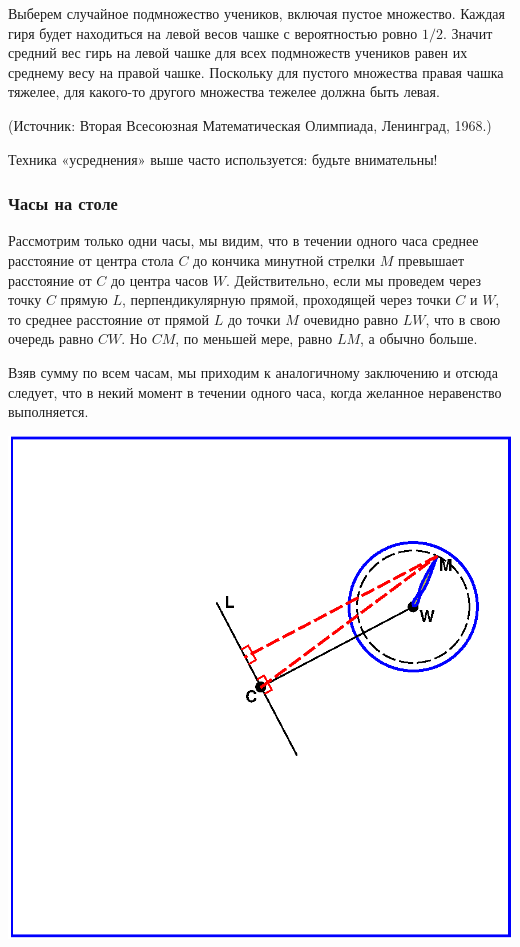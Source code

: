 
Выберем случайное подмножество учеников, включая пустое множество.
Каждая гиря будет находиться на левой весов чашке с вероятностью ровно $1/2$.
Значит средний вес гирь на левой чашке для всех подмножеств учеников 
равен их среднему весу на правой чашке. 
Поскольку для пустого множества правая чашка тяжелее, 
для какого-то другого множества тежелее должна быть левая.

(Источник: Вторая Всесоюзная Математическая Олимпиада, Ленинград, 1968.)\heart


Техника «усреднения» выше часто используется: будьте внимательны!


\subsubsection*{Часы на столе} %


Рассмотрим только одни часы, 
мы видим, что в течении одного часа среднее расстояние от центра стола $C$ до кончика минутной стрелки $M$ превышает  расстояние от $C$ до центра часов $W$.  
Действительно, если мы проведем через точку $C$ прямую $L$, перпендикулярную прямой, проходящей через точки $C$ и $W$, 
то среднее расстояние от прямой  $L$  до точки $M$ очевидно равно $LW$, 
что в свою очередь равно $CW$.  Но $CM$, по меньшей мере, равно $LM$, а обычно больше.

Взяв сумму по всем часам, мы приходим  к аналогичному заключению и отсюда следует, что в некий момент в течении одного часа, когда желанное неравенство выполняется.\heart


\begin{center}
\includegraphics[scale=0.6]{Figs/Insight/watch}
\end{center}

